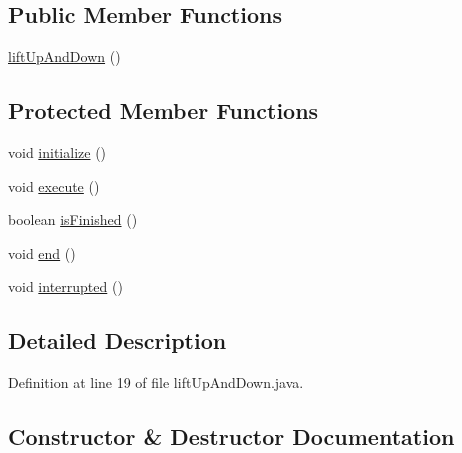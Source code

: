 \subsection*{Public Member Functions}
\begin{DoxyCompactItemize}
\item 
\mbox{\hyperlink{classorg_1_1usfirst_1_1frc3707_1_1_creedence_1_1commands_1_1lift_up_and_down_a943b92e13f0b767f1ba984800b57b5f7}{lift\+Up\+And\+Down}} ()
\end{DoxyCompactItemize}
\subsection*{Protected Member Functions}
\begin{DoxyCompactItemize}
\item 
void \mbox{\hyperlink{classorg_1_1usfirst_1_1frc3707_1_1_creedence_1_1commands_1_1lift_up_and_down_aef05a60c5aecddc94245574ee7078f16}{initialize}} ()
\item 
void \mbox{\hyperlink{classorg_1_1usfirst_1_1frc3707_1_1_creedence_1_1commands_1_1lift_up_and_down_a263caf19572f30cf6c6ac92a092b93d0}{execute}} ()
\item 
boolean \mbox{\hyperlink{classorg_1_1usfirst_1_1frc3707_1_1_creedence_1_1commands_1_1lift_up_and_down_adc60b6dd89b15d628419e53c4541d4a3}{is\+Finished}} ()
\item 
void \mbox{\hyperlink{classorg_1_1usfirst_1_1frc3707_1_1_creedence_1_1commands_1_1lift_up_and_down_a5d1d54ad47c7a95920d2fd8ea6d77241}{end}} ()
\item 
void \mbox{\hyperlink{classorg_1_1usfirst_1_1frc3707_1_1_creedence_1_1commands_1_1lift_up_and_down_ad2122ab64c98a55c32038673a0608467}{interrupted}} ()
\end{DoxyCompactItemize}


\subsection{Detailed Description}


Definition at line 19 of file lift\+Up\+And\+Down.\+java.



\subsection{Constructor \& Destructor Documentation}
\mbox{\label{classorg_1_1usfirst_1_1frc3707_1_1_creedence_1_1commands_1_1lift_up_and_down_a943b92e13f0b767f1ba984800b57b5f7}} 
